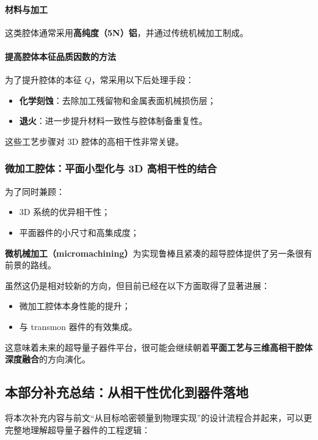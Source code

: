 \documentclass[12pt,a4paper,oneside]{ctexbook}
\begin{document}
\paragraph{材料与加工}
这类腔体通常采用\textbf{高纯度（5N）铝}，并通过传统机械加工制成。

\paragraph{提高腔体本征品质因数的方法}
为了提升腔体的本征 \(Q\)，常采用以下后处理手段：
\begin{itemize}
    \item \textbf{化学刻蚀}：去除加工残留物和金属表面机械损伤层；
    \item \textbf{退火}：进一步提升材料一致性与腔体制备重复性。
\end{itemize}

这些工艺步骤对 3D 腔体的高相干性非常关键。

\subsubsection{微加工腔体：平面小型化与 3D 高相干性的结合}

为了同时兼顾：
\begin{itemize}
    \item 3D 系统的优异相干性；
    \item 平面器件的小尺寸和高集成度；
\end{itemize}
\textbf{微机械加工（micromachining）}为实现鲁棒且紧凑的超导腔体提供了另一条很有前景的路线。

虽然这仍是相对较新的方向，但目前已经在以下方面取得了显著进展：
\begin{itemize}
    \item 微加工腔体本身性能的提升；
    \item 与 transmon 器件的有效集成。
\end{itemize}

这意味着未来的超导量子器件平台，很可能会继续朝着\textbf{平面工艺与三维高相干腔体深度融合}的方向演化。

\subsection{本部分补充总结：从相干性优化到器件落地}

将本次补充内容与前文“从目标哈密顿量到物理实现”的设计流程合并起来，可以更完整地理解超导量子器件的工程逻辑：
\end{document}
